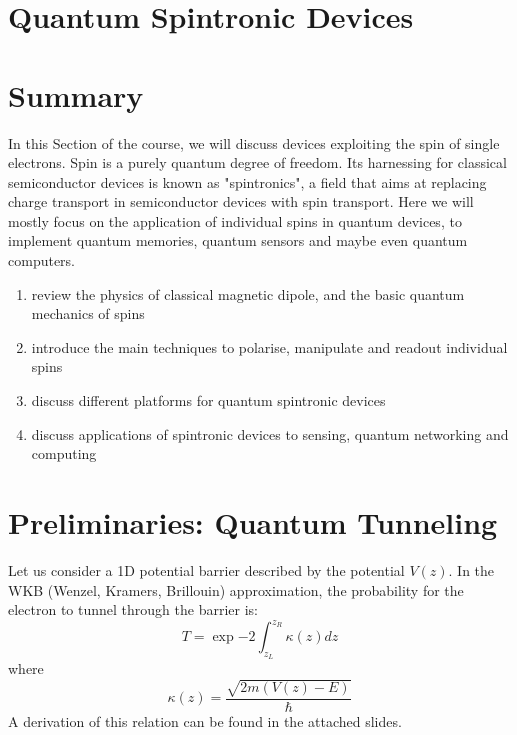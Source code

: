 \documentclass[a4paper,11pt]{article}
\newenvironment{exercise}[1]
    {\begin{tcolorbox}[colback=yellow!10!white,
                     colframe=white!20!black,
                     title=#1,  
                     center, 
                     valign=top, 
                     halign=left,
                     before skip=0.8cm, 
                     after skip=1.2cm,
                     center title, 
                     width=12cm]
    }
    {
    \end{tcolorbox}
    }
\begin{document}
\sffamily


\section* {Quantum Spintronic Devices}

\bigskip

\renewcommand{\labelenumi}{\alph{enumi}.}


\section* {Summary}
In this Section of the course, we will discuss devices exploiting the spin of single electrons. Spin is a purely quantum degree of freedom. Its harnessing for classical semiconductor devices is known as "spintronics", a field that aims at replacing charge transport in semiconductor devices with spin transport.
\newline Here we will mostly focus on the application of individual spins in quantum devices, to implement quantum memories, quantum sensors and maybe even quantum computers.

\begin{exercise}{Learning Objectives}
\begin{enumerate}
 \item review the physics of classical magnetic dipole, and the basic quantum mechanics of spins
 \item introduce the main techniques to polarise, manipulate and readout individual spins
 \item discuss different platforms for quantum spintronic devices
 \item discuss applications of spintronic devices to sensing, quantum networking and computing
\end{enumerate}
\end{exercise}

\section {Preliminaries: Quantum Tunneling}
Let us consider a 1D potential barrier described by the potential $V(z)$. In the WKB (Wenzel, Kramers, Brillouin) approximation, the probability for the electron to tunnel through the barrier is:
\begin{equation}
\label{eq:WKB}
    T = \exp{-2\int_{z_L}^{z_R} \kappa(z) dz}
\end{equation}
where
\begin{equation}
    \kappa (z) = \frac{\sqrt{2m(V(z)-E)}}{\hbar}
\end{equation}
A derivation of this relation can be found in the attached slides.
\end{document}
